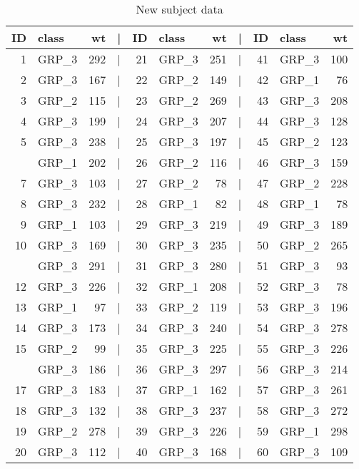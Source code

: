 \documentclass[smallextended]{svjour3}       %
\begin{document}
\begin{table}

\caption{\label{tab:new-data}New subject data}
\centering
\begin{tabular}[t]{rlrlrlrlrlr}
\toprule
ID & class & wt & | & ID & class & wt & | & ID & class & wt\\
\midrule
1 & GRP\_3 & 292 & | & 21 & GRP\_3 & 251 & | & 41 & GRP\_3 & 100\\
2 & GRP\_3 & 167 & | & 22 & GRP\_2 & 149 & | & 42 & GRP\_1 & 76\\
3 & GRP\_2 & 115 & | & 23 & GRP\_2 & 269 & | & 43 & GRP\_3 & 208\\
4 & GRP\_3 & 199 & | & 24 & GRP\_3 & 207 & | & 44 & GRP\_3 & 128\\
5 & GRP\_3 & 238 & | & 25 & GRP\_3 & 197 & | & 45 & GRP\_2 & 123\\
\addlinespace
6 & GRP\_1 & 202 & | & 26 & GRP\_2 & 116 & | & 46 & GRP\_3 & 159\\
7 & GRP\_3 & 103 & | & 27 & GRP\_2 & 78 & | & 47 & GRP\_2 & 228\\
8 & GRP\_3 & 232 & | & 28 & GRP\_1 & 82 & | & 48 & GRP\_1 & 78\\
9 & GRP\_1 & 103 & | & 29 & GRP\_3 & 219 & | & 49 & GRP\_3 & 189\\
10 & GRP\_3 & 169 & | & 30 & GRP\_3 & 235 & | & 50 & GRP\_2 & 265\\
\addlinespace
11 & GRP\_3 & 291 & | & 31 & GRP\_3 & 280 & | & 51 & GRP\_3 & 93\\
12 & GRP\_3 & 226 & | & 32 & GRP\_1 & 208 & | & 52 & GRP\_3 & 78\\
13 & GRP\_1 & 97 & | & 33 & GRP\_2 & 119 & | & 53 & GRP\_3 & 196\\
14 & GRP\_3 & 173 & | & 34 & GRP\_3 & 240 & | & 54 & GRP\_3 & 278\\
15 & GRP\_2 & 99 & | & 35 & GRP\_3 & 225 & | & 55 & GRP\_3 & 226\\
\addlinespace
16 & GRP\_3 & 186 & | & 36 & GRP\_3 & 297 & | & 56 & GRP\_3 & 214\\
17 & GRP\_3 & 183 & | & 37 & GRP\_1 & 162 & | & 57 & GRP\_3 & 261\\
18 & GRP\_3 & 132 & | & 38 & GRP\_3 & 237 & | & 58 & GRP\_3 & 272\\
19 & GRP\_2 & 278 & | & 39 & GRP\_3 & 226 & | & 59 & GRP\_1 & 298\\
20 & GRP\_3 & 112 & | & 40 & GRP\_3 & 168 & | & 60 & GRP\_3 & 109\\
\bottomrule
\end{tabular}
\end{table}
\end{document}
